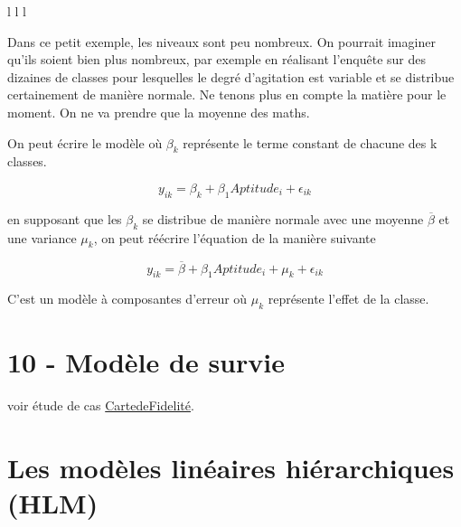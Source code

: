 \documentclass[
]{book}
\begin{document}
\begin{table}[ht]
\begin{centerbox}
\begin{threeparttable}
\begin{tabular}{l l l}
 \tabularnewline[-0.5pt]


\hhline{}
\end{tabular}
\end{threeparttable}\par\end{centerbox}

\end{table}
 

Dans ce petit exemple, les niveaux sont peu nombreux. On pourrait imaginer qu'ils soient bien plus nombreux, par exemple en réalisant l'enquête sur des dizaines de classes pour lesquelles le degré d'agitation est variable et se distribue certainement de manière normale. Ne tenons plus en compte la matière pour le moment. On ne va prendre que la moyenne des maths.

On peut écrire le modèle où \(\beta_{k}\) représente le terme constant de chacune des k classes.

\[ y_{ik}=\beta_{k}+\beta_{1}Aptitude_{i}+\epsilon_{ik} \]

en supposant que les \(\beta_{k}\) se distribue de manière normale avec une moyenne \(\overline{\beta}\) et une variance \(\mu_{k}\), on peut réécrire l'équation de la manière suivante

\[y_{ik}=\overline{\beta}+\beta_{1}Aptitude_{i}+\mu_{k}+\epsilon_{ik} \]

C'est un modèle à composantes d'erreur où \(\mu_{k}\) représente l'effet de la classe.

\hypertarget{section}{%
\subsection{}\label{section}}

\hypertarget{moduxe8le-de-survie}{%
\chapter{10 - Modèle de survie}\label{moduxe8le-de-survie}}

voir étude de cas \href{https://github.com/BenaventC/survival}{CartedeFidelité}.

\hypertarget{les-moduxe8les-linuxe9aires-hiuxe9rarchiques-hlm}{%
\chapter{Les modèles linéaires hiérarchiques (HLM)}\label{les-moduxe8les-linuxe9aires-hiuxe9rarchiques-hlm}}
\end{document}

